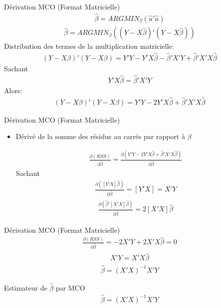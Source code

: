 \documentclass{beamer}
\begin{document}
\begin{frame}{Dérivation MCO (Format Matricielle)}
\begin{align*}
\hat{\beta} = ARGMIN_{\beta} (\hat{u}'\hat{u})
\end{align*}
\begin{align*}
\hat{\beta} = ARGMIN_{\beta} ((Y-X \hat{\beta})'(Y-X\hat{\beta}))
\end{align*}
Distribution des termes de la multiplication matricielle:
\begin{align*}
(Y-X \beta)' (Y-X \beta)=Y'Y-Y'X \hat{\beta}-\hat{\beta}'X'Y +\hat{\beta}'X'X \hat{\beta}
\end{align*}
Sachant 
\begin{align*}
Y'X \hat{\beta}=\hat{\beta}'X'Y
\end{align*}
Alors:
\begin{align*}
(Y-X \beta)' (Y-X \beta)=Y'Y -2Y'X \hat{\beta}+\hat{\beta}'X'X \hat{\beta}
\end{align*}
\end{frame}
\begin{frame}{Dérivation MCO (Format Matricielle)}
\begin{itemize}
\item Dérivé de la somme des résidus au carrés par rapport à $\beta$

\begin{align*}
\frac{\partial (RSS)}{\partial \hat{\beta}}=\frac{\partial (Y'Y -2Y'X \hat{\beta}+\hat{\beta}'X'X \hat{\beta})}{\partial \hat{\beta}}
\end{align*}
Sachant
\begin{align*}
\frac{\partial ([Y'X]\hat{\beta})}{\partial \hat{\beta}}=[Y'X]=X'Y
\end{align*}
\begin{align*}
\frac{\partial (\hat{\beta}'[X'X]\hat{\beta})}{\partial \hat{\beta}}=2[X'X]\hat{\beta}
\end{align*}
\end{itemize}
\end{frame}

\begin{frame}{Dérivation MCO (Format Matricielle)}
\begin{align*}
\frac{\partial (RSS)}{\partial \hat{\beta}}=-2X'Y+2X'X \hat{\beta}=0
\end{align*}
\begin{align*}
X'Y=X'X\hat{\beta}
\end{align*}
\begin{align*}
\hat{\beta}=(X'X)^{-1}X'Y
\end{align*}
\begin{block}{Estimateur de $\hat{\beta}$ par MCO}
\begin{align*}
\hat{\beta}=(X'X)^{-1}X'Y
\end{align*}
\end{block}
\end{frame}
\end{document}
